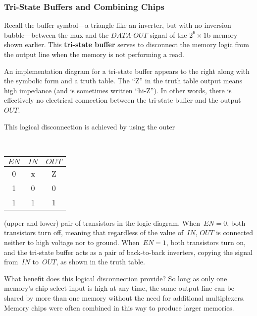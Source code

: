 \pagebreak

\subsubsection{Tri-State Buffers and Combining Chips}

Recall the buffer symbol---a triangle like an inverter, but with no
inversion bubble---between the mux and the \mbox{$DATA$-$OUT$} 
signal of the \mbox{$2^6\times{1}$b} memory shown earlier.  This 
{\bf tri-state buffer} serves to disconnect the memory logic 
from the output line when the memory is not performing a read. 

\begin{minipage}{1.75in}
An implementation diagram for a tri-state buffer appears to the right 
along with the symbolic
form and a truth table.  The ``Z'' in the truth table output means 
high impedance (and is sometimes written ``hi-Z'').  In other words,
there is effectively no electrical connection between the tri-state 
buffer and the output~$OUT$.\mpline

This logical disconnection is achieved by using the outer\linebreak
\end{minipage}\hspace{0.25in}%
\begin{minipage}{3in}
\\
\end{minipage}\hspace{0.25in}%
\begin{minipage}{1.25in}
\begin{tabular}{cc|c}
$EN$& $IN$& $OUT$\\ \hline
0& x& Z\\
1& 0& 0\\
1& 1& 1
\end{tabular}
\end{minipage}\mpdone

(upper and lower)
pair of transistors in the logic diagram.  When~$EN=0$, both transistors
turn off, meaning that regardless of the value of~$IN$, $OUT$ is connected
neither to high voltage nor to ground.
%
When~$EN=1$, both transistors turn on, and the tri-state buffer acts as
a pair of back-to-back inverters, copying the signal from~$IN$ to~$OUT$,
as shown in the truth table.

What benefit does this logical disconnection provide?
%
So long as only one memory's chip select input is high at any time,
the same output line can be shared by more than one memory
without the need for additional multiplexers.
%
Memory chips were often combined in this way to produce larger memories.

